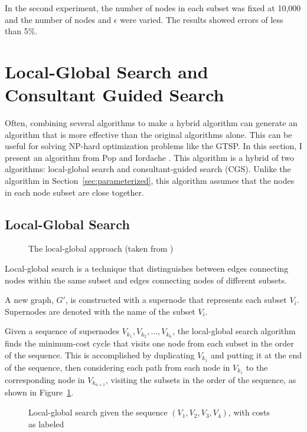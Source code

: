 \documentclass{sig-alternate}
\begin{document}
In the second experiment, the number of nodes in each subset was fixed at 10,000 and the number of nodes and $\epsilon$ were varied. The results showed errors of less than 5\%.

\section{Local-Global Search and Consultant Guided Search}
\label{sec:genetic}
Often, combining several algorithms to make a hybrid algorithm can generate an algorithm that is more effective than the original algorithms alone. This can be useful for solving NP-hard optimization problems like the GTSP. 
In this section, I present an algorithm from Pop and Iordache \cite{Pop:2011}. This algorithm is a hybrid of two algorithms: local-global search and consultant-guided search (CGS). Unlike the algorithm in Section~\ref{sec:parameterized}, this algorithm assumes that the nodes in each node subset are close together. 

\subsection{Local-Global Search}
\label{subs:localglobal}

\begin{figure}
\centering
{}
\caption{The local-global approach (taken from \cite{Pop:2011})}
\label{fig:localglobal1}
\end{figure}
Local-global search is a technique that distinguishes between edges connecting nodes within the same subset and edges connecting nodes of different subsets. 

A new graph, $G'$, is constructed with a supernode that represents each subset $V_{i}$. Supernodes are denoted with the name of the subset $V_{i}$.

Given a sequence of supernodes $V_{k_{1}},V_{k_{2}},...,V_{k_{n}}$, the local-global search algorithm finds the minimum-cost cycle that visits one node from each subset in the order of the sequence. This is accomplished by duplicating $V_{k_{1}}$ and putting it at the end of the sequence, then considering each path from each node in $V_{k_{1}}$ to the corresponding node in $V_{k_{n+1}}$, visiting the subsets in the order of the sequence, as shown in Figure~\ref{fig:localglobal1}.

\begin{figure}
\centering
{}
\caption{Local-global search given the sequence $(V_{1},V_{2},V_{3},V_{4})$, with costs as labeled}
\label{fig:localglobal2}
\end{figure}
\end{document}

